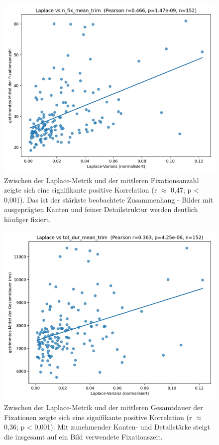 \documentclass[
    language=german, %
    thesis=seminar, %
    supervisor=postdoc, %
    multiauthor=true, %
    ]{settings/csssa-thesis}
\begin{document}
\begin{figure}[h]
    \centering
    \includegraphics[width=\linewidth,height=0.8\textheight,keepaspectratio]{figures/Bild7.png}
    \caption{Zwischen der Laplace-Metrik und der mittleren Fixationsanzahl zeigte sich eine signifikante positive Korrelation (r $\approx$ 0,47; p < 0,001). Das ist der stärkste beobachtete Zusammenhang - Bilder mit ausgeprägten Kanten und feiner Detailstruktur werden deutlich häufiger fixiert.
 }\label{fig:bild7}
\end{figure}
\begin{figure}[h]
    \centering
    \includegraphics[width=\linewidth,height=0.8\textheight,keepaspectratio]{figures/Bild8.png}
    \caption{Zwischen der Laplace-Metrik und der mittleren Gesamtdauer der Fixationen zeigte sich eine signifikante positive Korrelation (r $\approx$ 0,36; p < 0,001). Mit zunehmender Kanten- und Detailstärke steigt die insgesamt auf ein Bild verwendete Fixationszeit.
 }\label{fig:bild8}
\end{figure}
\end{document}
